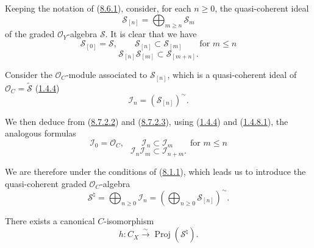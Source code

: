 \begin{env}[8.7.2]
\label{II.8.7.2}
Keeping the notation of (\hyperref[II.8.6.1]{8.6.1}), consider, for each
$n\geqslant 0$, the quasi-coherent ideal
\begin{equation}
\label{II.8.7.2.1}
  \mathcal{S}_{[n]}=\bigoplus_{m\geqslant n}\mathcal{S}_m
\tag{8.7.2.1}
\end{equation}
of the graded $\mathcal{O}_Y$-algebra $\mathcal{S}$. It is clear that we have
\begin{equation}
\label{II.8.7.2.2}
  \mathcal{S}_{[0]}=\mathcal{S},\qquad
  \mathcal{S}_{[n]}\subset\mathcal{S}_{[m]}
  \qquad\text{for }m\leqslant n
\tag{8.7.2.2}
\end{equation}
\begin{equation}
\label{II.8.7.2.3}
  \mathcal{S}_{[n]}\mathcal{S}_{[m]}\subset\mathcal{S}_{[m+n]}.
\tag{8.7.2.3}
\end{equation}

Consider the $\mathcal{O}_C$-module associated to $\mathcal{S}_{[n]}$, which is
a quasi-coherent ideal of $\mathcal{O}_C=\widetilde{\mathcal{S}}$
(\hyperref[II.1.4.4]{1.4.4})
\begin{equation}
\label{II.8.7.2.4}
  \mathcal{I}_n=(\mathcal{S}_{[n]})^{\sim}.
\tag{8.7.2.4}
\end{equation}

We then deduce from (\hyperref[II.8.7.2.2]{8.7.2.2}) and
(\hyperref[II.8.7.2.3]{8.7.2.3}), using
(\hyperref[II.1.4.4]{1.4.4}) and (\hyperref[II.1.4.8.1]{1.4.8.1}),
the analogous formulas
\begin{equation}
\label{II.8.7.2.5}
  \mathcal{I}_0=\mathcal{O}_C,\qquad
  \mathcal{I}_n\subset\mathcal{I}_m
  \qquad\text{for }m\leqslant n
\tag{8.7.2.5}
\end{equation}
\begin{equation}
\label{II.8.7.2.6}
  \mathcal{I}_n\mathcal{I}_m\subset\mathcal{I}_{n+m}.
\tag{8.7.2.6}
\end{equation}

We are therefore under the conditions of (\hyperref[II.8.1.1]{8.1.1}),
which leads us to introduce the quasi-coherent graded $\mathcal{O}_C$-algebra
\begin{equation}
\label{II.8.7.2.7}
  \mathcal{S}^{\natural}
  =\bigoplus_{n\geqslant 0}\mathcal{I}_n
  =\left(\bigoplus_{n\geqslant 0}\mathcal{S}_{[n]}\right)^{\sim}.
\tag{8.7.2.7}
\end{equation}
\end{env}

\begin{proposition}[8.7.3]
\label{II.8.7.3}
There exists a canonical $C$-isomorphism
\begin{equation}
\label{II.8.7.3.1}
  h:C_X\xrightarrow{\sim}\operatorname{Proj}(\mathcal{S}^{\natural}).
\tag{8.7.3.1}
\end{equation}
\end{proposition}

